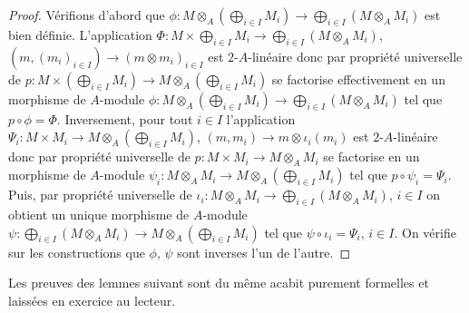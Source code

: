 \begin{proof}Vérifions d'abord que $\phi:M\otimes_A(\bigoplus_{i\in I}M_{i}) \rightarrow  \bigoplus_{i\in I}(M\otimes_AM_{i})$ est bien définie. L'application $\Phi:M\times \bigoplus_{i\in I}M_{i}\rightarrow  \bigoplus_{i\in I}(M\otimes_AM_{i})$, $(m,(m_i)_{i\in I})\rightarrow (m\otimes m_i)_{i\in I}$ est $2$-$A$-linéaire donc par propriété universelle de $p:M\times (\bigoplus_{i\in I}M_{i})\rightarrow M\otimes_A(\bigoplus_{i\in I}M_{i})$ se factorise effectivement en un morphisme de $A$-module $\phi:M\otimes_A(\bigoplus_{i\in I}M_{i}) \rightarrow  \bigoplus_{i\in I}(M\otimes_AM_{i})$ tel que $p\circ \phi=\Phi$. Inversement, pour tout $i\in I$ l'application $\Psi_i:M\times M_i\rightarrow M\otimes_A(\bigoplus_{i\in I}M_{i})$, $(m,m_i)\rightarrow m\otimes \iota_i(m_i)$ est $2$-$A$-linéaire donc  par propriété universelle de $p:M\times M_{i}\rightarrow M\otimes_A M_i$ se factorise  en un morphisme de $A$-module $\psi_i:M\otimes_A M_{i} \rightarrow  M\otimes_A(\bigoplus_{i\in I}M_{i})$ tel que $p\circ \psi_i=\Psi_i$. Puis, par propriété universelle de $\iota_i:M\otimes_A M_i\rightarrow \bigoplus_{i\in I}(M\otimes_AM_{i}) $, $i\in I$ on obtient un unique morphisme de $A$-module $\psi:\bigoplus_{i\in I}(M\otimes_AM_{i})\rightarrow M\otimes_A(\bigoplus_{i\in I}M_{i})$ tel que $\psi\circ \iota_i=\Psi_i$, $i\in I$. On vérifie sur les constructions que $\phi$, $\psi$ sont inverses l'un de l'autre.\end{proof}



 Les preuves des lemmes suivant sont du même acabit \ie{} purement formelles et laissées en exercice au lecteur.






